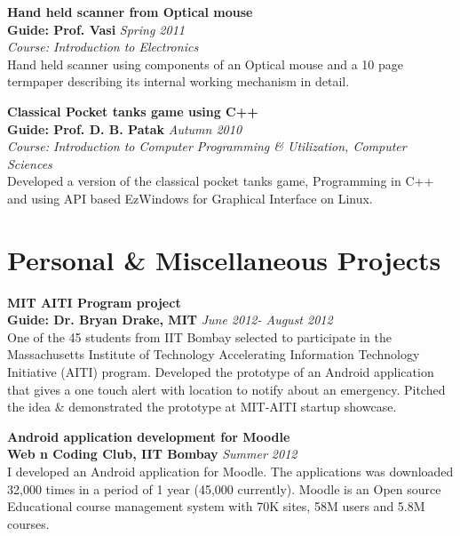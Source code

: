 \documentclass[margin,line]{resume}
\begin{document}
\begin{resume}
	{\bf Hand held scanner from Optical mouse} \\
    {\bf Guide: Prof. Vasi} 	\hfill \textit{Spring 2011} \\
    { \it Course: Introduction to Electronics}\\
    Hand held scanner using components of an Optical mouse and a 10 page termpaper describing its internal working mechanism in detail.
	
	{\bf Classical Pocket tanks game using C++} \\
    {\bf Guide: Prof. D. B. Patak} 	\hfill \textit{Autumn 2010} \\
    { \it Course: Introduction to Computer Programming \& Utilization, Computer Sciences}\\
	Developed a version of the classical pocket tanks game, Programming in C++ and using API based EzWindows for Graphical Interface on Linux.

\vspace{3mm}

\section{\mysidestyle Personal \& Miscellaneous Projects}
\vspace{0mm}

    {\bf MIT AITI Program project} \\
    {\bf Guide: Dr. Bryan Drake, MIT} 	\hfill \textit{June 2012- August 2012} \\   
	One of the 45 students from IIT Bombay selected to participate in the  Massachusetts Institute of Technology Accelerating Information Technology Initiative (AITI) program. Developed the prototype of an Android application that gives a one touch alert with location to notify about an emergency. Pitched the idea \& demonstrated the prototype at MIT-AITI startup showcase.

\pagebreak
	
	{\bf Android application development for Moodle} \\
    {\bf Web n Coding Club, IIT Bombay} 	                                \hfill \textit{Summer 2012} \\ 
	 I developed an Android application for Moodle. The applications was downloaded 32,000 times in a period of 1 year (45,000 currently). Moodle is an Open source Educational course management system with 70K sites, 58M users and 5.8M courses.
	

\end{resume}
\end{document}

